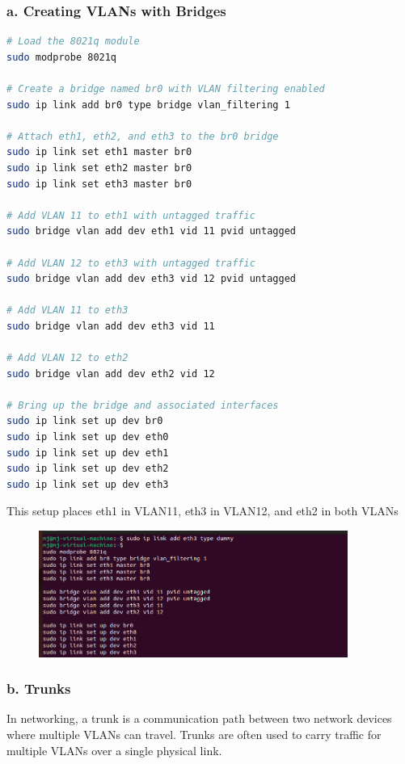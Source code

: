 \documentclass{report}
\begin{document}
\subsubsection*{a. Creating VLANs with Bridges}

\begin{lstlisting}[language=bash]
# Load the 8021q module
sudo modprobe 8021q

# Create a bridge named br0 with VLAN filtering enabled
sudo ip link add br0 type bridge vlan_filtering 1

# Attach eth1, eth2, and eth3 to the br0 bridge
sudo ip link set eth1 master br0
sudo ip link set eth2 master br0
sudo ip link set eth3 master br0

# Add VLAN 11 to eth1 with untagged traffic 
sudo bridge vlan add dev eth1 vid 11 pvid untagged

# Add VLAN 12 to eth3 with untagged traffic 
sudo bridge vlan add dev eth3 vid 12 pvid untagged

# Add VLAN 11 to eth3
sudo bridge vlan add dev eth3 vid 11

# Add VLAN 12 to eth2
sudo bridge vlan add dev eth2 vid 12

# Bring up the bridge and associated interfaces
sudo ip link set up dev br0
sudo ip link set up dev eth0
sudo ip link set up dev eth1
sudo ip link set up dev eth2
sudo ip link set up dev eth3
\end{lstlisting} 

This setup places eth1 in VLAN11, eth3 in VLAN12, and eth2 in both VLANs\cite{5}

\begin{figure}[h] 
  \centering 
  \includegraphics[width=0.9\textwidth]{19.png} 
\end{figure} 


\subsubsection*{b. Trunks}

In networking, a trunk is a communication path between two network devices where multiple VLANs can travel.
Trunks are often used to carry traffic for multiple VLANs over a single physical link.
\end{document}
